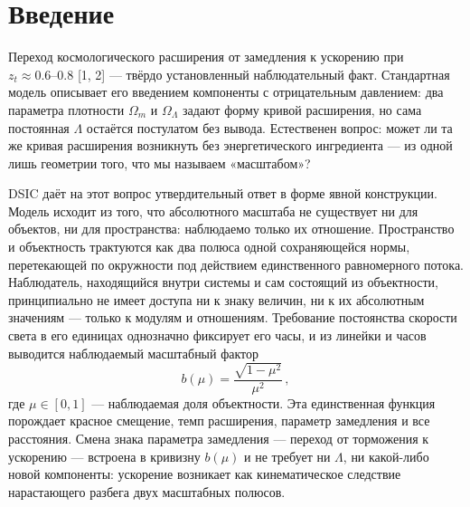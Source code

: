 \documentclass{article}
\begin{document}
\begin{abstract}
Ранняя Вселенная вынесена во \textbf{второй этаж} модели (Часть II): форма поправки к пути света выводится из дополнительного постулата о связанности объектов, а единственный порог $\mu_d \approx 0.9806$ ($z \approx 4.5$) калибруется по одному наблюдению --- расстоянию до поверхности последнего рассеяния; статус этой надстройки --- калибровка при фиксированной постулатом форме, а не предсказание --- оговаривается явно. Рост структур не выводится из ядра; фон модели проверен на совместимость со стандартным (GR-предельным) ростом линейных возмущений: на компиляции $f\sigma_8$ («Gold-2017» [13, 14]) восстанавливается $S_8 \approx 0.76$, статистически неотличимо от $\Lambda$CDM (\S12); вывод роста из связанности остаётся направлением развития. Все эмпирические утверждения воспроизводятся скриптами из открытого репозитория.
\end{abstract}
\section{Введение}

Переход космологического расширения от замедления к ускорению при $z_t \approx 0.6\text{--}0.8$ [1, 2] --- твёрдо установленный наблюдательный факт. Стандартная модель описывает его введением компоненты с отрицательным давлением: два параметра плотности $\Omega_m$ и $\Omega_\Lambda$ задают форму кривой расширения, но сама постоянная $\Lambda$ остаётся постулатом без вывода. Естественен вопрос: может ли та же кривая расширения возникнуть без энергетического ингредиента --- из одной лишь геометрии того, что мы называем «масштабом»?

DSIC даёт на этот вопрос утвердительный ответ в форме явной конструкции. Модель исходит из того, что абсолютного масштаба не существует ни для объектов, ни для пространства: наблюдаемо только их отношение. Пространство и объектность трактуются как два полюса одной сохраняющейся нормы, перетекающей по окружности под действием единственного равномерного потока. Наблюдатель, находящийся внутри системы и сам состоящий из объектности, принципиально не имеет доступа ни к знаку величин, ни к их абсолютным значениям --- только к модулям и отношениям. Требование постоянства скорости света в его единицах однозначно фиксирует его часы, и из линейки и часов выводится наблюдаемый масштабный фактор
\begin{equation}
b(\mu) = \frac{\sqrt{1 - \mu^2}}{\mu^2}\,,
\end{equation}
где $\mu \in [0, 1]$ --- наблюдаемая доля объектности. Эта единственная функция порождает красное смещение, темп расширения, параметр замедления и все расстояния. Смена знака параметра замедления --- переход от торможения к ускорению --- встроена в кривизну $b(\mu)$ и не требует ни $\Lambda$, ни какой-либо новой компоненты: ускорение возникает как кинематическое следствие нарастающего разбега двух масштабных полюсов.
\end{document}
